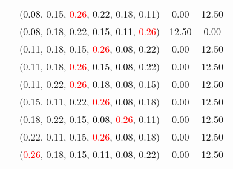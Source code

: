 \documentclass[10pt,a4paper]{report}
\begin{document}
\begin{center}
\begin{longtable}{clcc}
			&(\textcolor{black}{0.08}, 0.15, \textcolor{red}{0.26}, 0.22, 0.18, 0.11)&0.00&12.50\\
			&(\textcolor{black}{0.08}, 0.18, 0.22, 0.15, 0.11, \textcolor{red}{0.26})&12.50&0.00\\
			&(0.11, 0.18, 0.15, \textcolor{red}{0.26}, \textcolor{black}{0.08}, 0.22)&0.00&12.50\\
			&(0.11, 0.18, \textcolor{red}{0.26}, 0.15, \textcolor{black}{0.08}, 0.22)&0.00&12.50\\
			&(0.11, 0.22, \textcolor{red}{0.26}, 0.18, \textcolor{black}{0.08}, 0.15)&0.00&12.50\\
			&(0.15, 0.11, 0.22, \textcolor{red}{0.26}, \textcolor{black}{0.08}, 0.18)&0.00&12.50\\
			&(0.18, 0.22, 0.15, \textcolor{black}{0.08}, \textcolor{red}{0.26}, 0.11)&0.00&12.50\\
			&(0.22, 0.11, 0.15, \textcolor{red}{0.26}, \textcolor{black}{0.08}, 0.18)&0.00&12.50\\
			&(\textcolor{red}{0.26}, 0.18, 0.15, 0.11, \textcolor{black}{0.08}, 0.22)&0.00&12.50\\
		\bottomrule
	\end{longtable}
\end{center}
\end{document}
